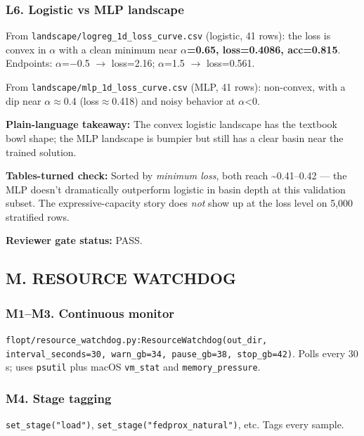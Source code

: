 \documentclass{article}
\begin{document}
\subsubsection{L6. Logistic vs MLP landscape}


From \texttt{landscape/logreg\_1d\_loss\_curve.csv} (logistic, 41 rows): the loss is convex in \ensuremath{\alpha} with a clean minimum near \textbf{\ensuremath{\alpha}=0.65, loss=0.4086, acc=0.815}. Endpoints: \ensuremath{\alpha}=\ensuremath{-}0.5 \ensuremath{\rightarrow} loss=2.16; \ensuremath{\alpha}=1.5 \ensuremath{\rightarrow} loss=0.561.


From \texttt{landscape/mlp\_1d\_loss\_curve.csv} (MLP, 41 rows): non-convex, with a dip near \ensuremath{\alpha}\ensuremath{\approx}0.4 (loss\ensuremath{\approx}0.418) and noisy behavior at \ensuremath{\alpha}<0.


\textbf{Plain-language takeaway:} The convex logistic landscape has the textbook bowl shape; the MLP landscape is bumpier but still has a clear basin near the trained solution.


\textbf{Tables-turned check:} Sorted by \emph{minimum loss}, both reach \textasciitilde{}0.41--0.42 --- the MLP doesn't dramatically outperform logistic in basin depth at this validation subset. The expressive-capacity story does \emph{not} show up at the loss level on 5,000 stratified rows.


\textbf{Reviewer gate status:} PASS.


\subsection{M. RESOURCE WATCHDOG}


\subsubsection{M1--M3. Continuous monitor}


\texttt{flopt/resource\_watchdog.py:ResourceWatchdog(out\_dir, interval\_seconds=30, warn\_gb=34, pause\_gb=38, stop\_gb=42)}. Polls every 30 s; uses \texttt{psutil} plus macOS \texttt{vm\_stat} and \texttt{memory\_pressure}.


\subsubsection{M4. Stage tagging}


\texttt{set\_stage("load")}, \texttt{set\_stage("fedprox\_natural")}, etc. Tags every sample.
\end{document}
